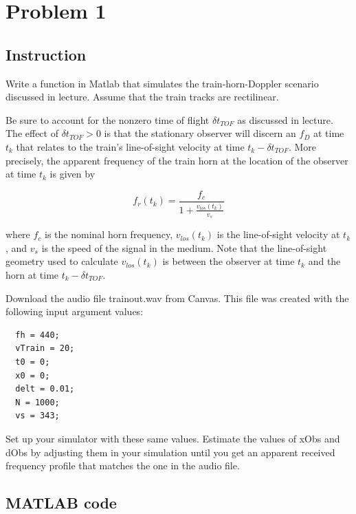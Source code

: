 \section{Problem 1}

\subsection{Instruction}

Write a function in Matlab that simulates the train-horn-Doppler scenario
discussed in lecture. Assume that the train tracks are rectilinear.

Be sure to account for the nonzero time of flight $\delta t_{TOF}$ as discussed
in lecture. The effect of $\delta t_{TOF} > 0$ is that the stationary observer
will discern an $f_D$ at time $t_k$ that relates to the train’s line-of-sight
velocity at time $t_k − \delta t_{TOF}$. More precisely, the apparent frequency
of the train horn at the location of the observer at time $t_k$ is given by

\begin{equation}
	f_r(t_k) = \frac{f_c}{1 + \frac{v_{los}(t_k)}{v_s}}
\end{equation}

where $f_c$ is the nominal horn frequency, $v_{los}(t_k)$ is the line-of-sight
velocity at $t_k$, and $v_s$ is the speed of the signal in the medium. Note that
the line-of-sight geometry used to calculate $v_{los}(t_k)$  is between the
observer at time $t_k$ and the horn at time $t_k − \delta t_{TOF}$.

Download the audio file trainout.wav from Canvas. This file was created with the
following input argument values:

\begin{lstlisting}
  fh = 440;
  vTrain = 20;
  t0 = 0;
  x0 = 0;
  delt = 0.01;
  N = 1000;
  vs = 343;
\end{lstlisting}

Set up your simulator with these same values. Estimate the values of xObs and
dObs by adjusting them in your simulation until you get an apparent received
frequency profile that matches the one in the audio file.

\subsection{MATLAB code}




